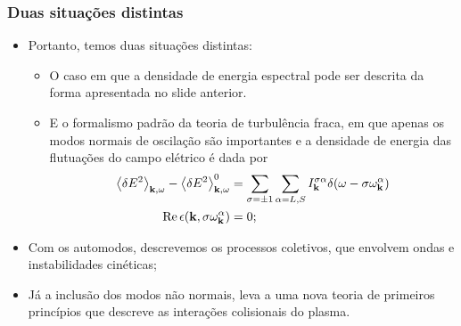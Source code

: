 \documentclass[10pt,aspectratio=1610,lualatex]{beamer}
\begin{document}
\begin{frame}
  \frametitle{Duas situações distintas}
  \begin{itemize}
    \item Portanto, temos duas situações distintas:
      \vspace{0.1cm}
      \pause
      \begin{itemize}
         \item O caso em que a densidade de energia espectral pode ser
      descrita da forma apresentada no slide anterior.
    \pause
      \item E o formalismo padrão da teoria de turbulência fraca, em que
      apenas os modos normais de oscilação são importantes e a densidade
      de energia das flutuações do campo elétrico é dada por
      \begin{equation*}
	\label{collective}
	\begin{split}
	  \left< \delta E^2 \right>_{{\bf k},\omega}
	  -\left< \delta E^2 \right>_{{\bf k},\omega}^0
	  &=\sum_{\sigma=\pm 1}\sum_{\alpha=L,S}
	  I_{\bf k}^{\sigma \alpha}
	  \delta(\omega-\sigma \omega_{\bf k}^\alpha)\\
	  \mbox{Re}\, \epsilon({\bf k},\sigma\omega_{\bf k}^\alpha)&=0;
	\end{split}
      \end{equation*}
    \end{itemize}
    \vspace{0.1cm}
    \pause
    \item Com os automodos, descrevemos os processos coletivos, que
    envolvem ondas e instabilidades cinéticas;
    \vspace{0.1cm}
    \pause
    \item Já a inclusão dos modos não normais, leva a uma nova teoria
    de primeiros princípios que descreve as interações colisionais do
    plasma.
  \end{itemize}
\end{frame}
\end{document}

